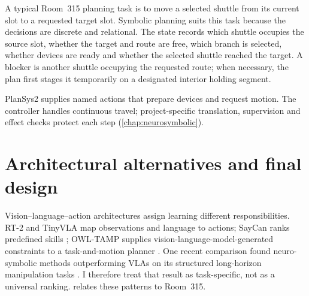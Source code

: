 A typical Room~315 planning task is to move a selected shuttle from its current
slot to a requested target slot. Symbolic planning suits this task because the
decisions are discrete and relational. The state records which shuttle occupies
the source slot, whether the target and route are free, which branch is selected,
whether devices are ready and whether the selected shuttle reached the target.
A blocker is another shuttle occupying the requested route; when
necessary, the plan first stages it temporarily on a designated interior
holding segment.

PlanSys2 supplies named actions that prepare devices and request motion. The
controller handles continuous travel; project-specific translation, supervision
and effect checks protect each step (\cref{chap:neurosymbolic}).

\section{Architectural alternatives and final design}

Vision--language--action architectures assign learning different
responsibilities. RT-2 \citep{rt2} and TinyVLA \citep{tinyvla} map observations
and language to actions; SayCan ranks predefined skills \citep{saycan};
OWL-TAMP supplies vision-language-model-generated constraints to a
task-and-motion planner \citep{owltamp}. One recent comparison found
neuro-symbolic methods outperforming VLAs on its structured long-horizon
manipulation tasks \citep{pricenotright}. I therefore treat that result as
task-specific, not as a universal ranking. 
relates these patterns to Room~315.

